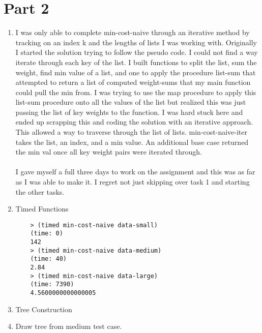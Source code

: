 \documentclass[a4paper,12pt]{article}
\begin{document}
\section{Part 2}
\begin{enumerate}
\item 
I was only able to complete min-cost-naive through an iterative method by tracking on an index k and the lengths of lists I was working with. Originally I started the solution trying to follow the pseudo code. I could not find a way iterate through each key of the list. I built functions to split the list, sum the weight, find min value of a list, and one to apply the procedure list-sum that attempted to return a list of computed weight-sums that my main function could pull the min from. I was trying to use the map procedure to apply this list-sum procedure onto all the values of the list but realized this was just passing the list of key weights to the function. I was hard stuck here and ended up scrapping this and coding the solution with an iterative approach. This allowed a way to traverse through the list of lists. min-cost-naive-iter takes the list, an index, and a min value. An additional base case returned the min val once all key weight pairs were iterated through. \\
\\
I gave myself a full three days to work on the assignment and this was as far as I was able to make it. I regret not just skipping over task 1 and starting the other tasks.
\newpage
\item Timed Functions\\
\lstset{basicstyle=\footnotesize\ttfamily,breaklines=true}
\begin{lstlisting}
	> (timed min-cost-naive data-small)
	(time: 0)
	142
	> (timed min-cost-naive data-medium)
	(time: 40)
	2.84
	> (timed min-cost-naive data-large)
	(time: 7390)
	4.5600000000000005
\end{lstlisting}

\item Tree Construction

\item Draw tree from medium test case.
\end{enumerate}

%

%
	
\end{document}
